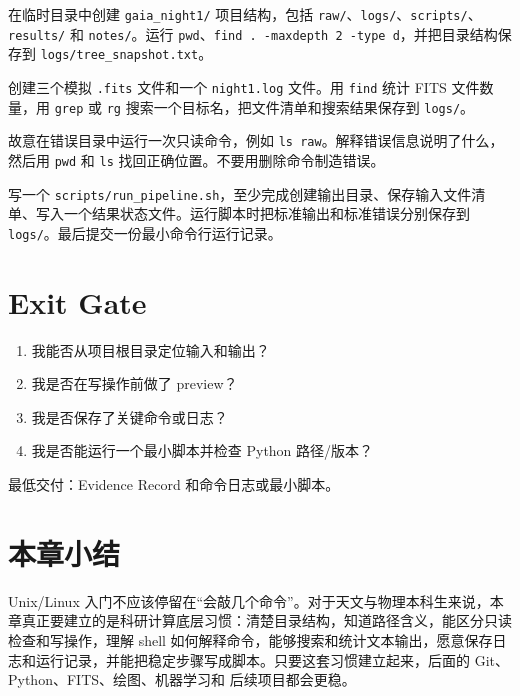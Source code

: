 \begin{exercisebox}[基础练习]
在临时目录中创建 \texttt{gaia\_night1/} 项目结构，包括 \texttt{raw/}、\texttt{logs/}、\texttt{scripts/}、\texttt{results/} 和 \texttt{notes/}。运行 \texttt{pwd}、\texttt{find . -maxdepth 2 -type d}，并把目录结构保存到 \texttt{logs/tree\_snapshot.txt}。
\end{exercisebox}

\begin{exercisebox}[过程练习]
创建三个模拟 \texttt{.fits} 文件和一个 \texttt{night1.log} 文件。用 \texttt{find} 统计 FITS 文件数量，用 \texttt{grep} 或 \texttt{rg} 搜索一个目标名，把文件清单和搜索结果保存到 \texttt{logs/}。
\end{exercisebox}

\begin{exercisebox}[诊断练习]
故意在错误目录中运行一次只读命令，例如 \texttt{ls raw}。解释错误信息说明了什么，然后用 \texttt{pwd} 和 \texttt{ls} 找回正确位置。不要用删除命令制造错误。
\end{exercisebox}

\begin{exercisebox}[交付练习]
写一个 \texttt{scripts/run\_pipeline.sh}，至少完成创建输出目录、保存输入文件清单、写入一个结果状态文件。运行脚本时把标准输出和标准错误分别保存到 \texttt{logs/}。最后提交一份最小命令行运行记录。
\end{exercisebox}

\section{Exit Gate}

\begin{enumerate}
    \item 我能否从项目根目录定位输入和输出？
    \item 我是否在写操作前做了 preview？
    \item 我是否保存了关键命令或日志？
    \item 我是否能运行一个最小脚本并检查 Python 路径/版本？
\end{enumerate}

最低交付：Evidence Record 和命令日志或最小脚本。

\section{本章小结}

Unix/Linux 入门不应该停留在“会敲几个命令”。对于天文与物理本科生来说，本章真正要建立的是科研计算底层习惯：清楚目录结构，知道路径含义，能区分只读检查和写操作，理解 shell 如何解释命令，能够搜索和统计文本输出，愿意保存日志和运行记录，并能把稳定步骤写成脚本。只要这套习惯建立起来，后面的 Git、Python、FITS、绘图、机器学习和 后续项目都会更稳。
